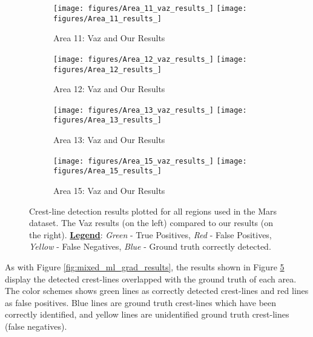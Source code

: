 \begin{figure}
	\ContinuedFloat
	\centering
	\begin{subfigure}{\textwidth}
		\centering
		\texttt{[image: figures/Area\_11\_vaz\_results\_]}
		\texttt{[image: figures/Area\_11\_results\_]}
		\caption{ Area 11: Vaz \cite{vaz_object_based_dune_analysis} and Our Results }
		\label{fig:mixed_ml_grad_area11_results}
	\end{subfigure}
	\begin{subfigure}{\textwidth}
		\centering
		\texttt{[image: figures/Area\_12\_vaz\_results\_]}
		\texttt{[image: figures/Area\_12\_results\_]}
		\caption{ Area 12: Vaz \cite{vaz_object_based_dune_analysis} and Our Results }
		\label{fig:mixed_ml_grad_area12_results}
	\end{subfigure}
	\begin{subfigure}{\textwidth}
		\centering
		\texttt{[image: figures/Area\_13\_vaz\_results\_]}
		\texttt{[image: figures/Area\_13\_results\_]}
		\caption{ Area 13: Vaz \cite{vaz_object_based_dune_analysis} and Our Results }
		\label{fig:mixed_ml_grad_area13_results}
	\end{subfigure}
	\begin{subfigure}{\textwidth}
		\centering
		\texttt{[image: figures/Area\_15\_vaz\_results\_]}
		\texttt{[image: figures/Area\_15\_results\_]}
		\caption{ Area 15: Vaz \cite{vaz_object_based_dune_analysis} and Our Results }
		\label{fig:mixed_ml_grad_area15_results}
	\end{subfigure}
	\caption{ Crest-line detection results plotted for all regions used in the Mars dataset. The Vaz \cite{vaz_object_based_dune_analysis} results (on the left) compared to our results (on the right). \underline{\textbf{Legend}}: \emph{Green} - True Positives, \emph{Red} - False Positives, \emph{Yellow} - False Negatives, \emph{Blue} - Ground truth correctly detected. }
	\label{fig:mixed_ml_grad_mars_results}
\end{figure}

As with Figure \ref{fig:mixed_ml_grad_results}, the results shown in Figure \ref{fig:mixed_ml_grad_mars_results} display the detected crest-lines overlapped with the ground truth of each area. The color schemes shows green lines as correctly detected crest-lines and red lines as false positives. Blue lines are ground truth crest-lines which have been correctly identified, and yellow lines are unidentified ground truth crest-lines (false negatives). 

